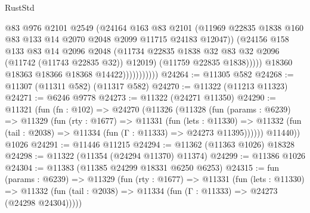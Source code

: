 \begin{lexlean}{RustStd}
\begin{coremodule}
                                @83
                                @976
                                @2101
                                @2549
                                (@24164
                                  @163
                                  @83
                                  @2101
                                  (@11969
                                    @22835
                                    @1838
                                    @160
                                    @83
                                    @133
                                    @14
                                    @2070
                                    @2048
                                    @2099
                                    @11715
                                    @24183
                                    @12047))
                                (@24156
                                  @158
                                  @133
                                  @83
                                  @14
                                  @2096
                                  @2048
                                  (@11734
                                    @22835
                                    @1838
                                    @32
                                    @83
                                    @32
                                    @2096
                                    (@11742 (@11743 @22835 @32))
                                    @12019)
                                  (@11759 @22835 @1838)))))
                          @18360
                          @18363
                          @18366
                          @18368
                          @14422)))))))))))
@24264 := @11305 @582
@24268 := @11307 (@11311 @582) (@11317 @582)
@24270 := @11322 (@11213 @11323)
@24271 := @6246 @9778
@24273 := @11322 (@24271 @11350)
@24290 := @11321
    (fun (fn : @102) =>
    @24270
      (@11326
        (@11328
          (fun (params : @6239) =>
          @11329
            (fun (rty : @1677) =>
            @11331
              (fun (lets : @11330) =>
              @11332 (fun (tail : @2038) => @11334 (fun (Γ : @11333) => @24273 @11395))))))
        @11440))
    @1026
@24291 := @11446 @11215
@24294 := @11362 (@11363 @1026) @18328
@24298 := @11322 (@11354 (@24294 @11370) @11374)
@24299 := @11386 @1026
@24304 := @11383 (@11385 @24299 @18331 @6250 @6253)
@24315 := fun (params : @6239) =>
  @11329
    (fun (rty : @1677) =>
    @11331
      (fun (lets : @11330) =>
      @11332 (fun (tail : @2038) => @11334 (fun (Γ : @11333) => @24273 (@24298 @24304)))))

\end{coremodule}
\end{lexlean}
